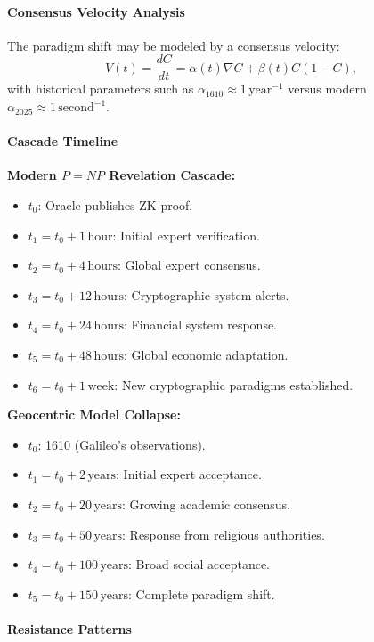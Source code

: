 \documentclass[11pt]{article}
\begin{document}
\paragraph{Consensus Velocity Analysis}

The paradigm shift may be modeled by a consensus velocity:
\[
V(t) = \frac{dC}{dt} = \alpha(t) \nabla C + \beta(t) C (1-C),
\]
with historical parameters such as $\alpha_{1610}\approx 1\,\text{year}^{-1}$ versus modern $\alpha_{2025}\approx 1\,\text{second}^{-1}$.

\paragraph{Cascade Timeline}

\textbf{Modern $P=NP$ Revelation Cascade:}
\begin{itemize}
    \item $t_0$: Oracle publishes ZK-proof.
    \item $t_1=t_0+1\,\text{hour}$: Initial expert verification.
    \item $t_2=t_0+4\,\text{hours}$: Global expert consensus.
    \item $t_3=t_0+12\,\text{hours}$: Cryptographic system alerts.
    \item $t_4=t_0+24\,\text{hours}$: Financial system response.
    \item $t_5=t_0+48\,\text{hours}$: Global economic adaptation.
    \item $t_6=t_0+1\,\text{week}$: New cryptographic paradigms established.
\end{itemize}

\textbf{Geocentric Model Collapse:}
\begin{itemize}
    \item $t_0$: 1610 (Galileo's observations).
    \item $t_1=t_0+2\,\text{years}$: Initial expert acceptance.
    \item $t_2=t_0+20\,\text{years}$: Growing academic consensus.
    \item $t_3=t_0+50\,\text{years}$: Response from religious authorities.
    \item $t_4=t_0+100\,\text{years}$: Broad social acceptance.
    \item $t_5=t_0+150\,\text{years}$: Complete paradigm shift.
\end{itemize}

\paragraph{Resistance Patterns}
\end{document}
